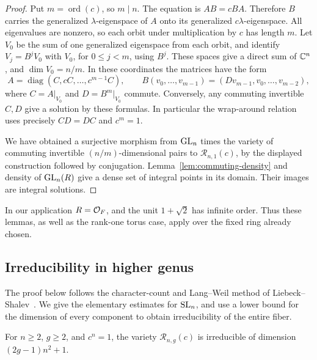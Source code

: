 \begin{proof}
Put \(m=\operatorname{ord}(c)\), so \(m\mid n\).  The equation is
\(AB=cBA\).  Therefore \(B\) carries the generalized
\(\lambda\)-eigenspace of \(A\) onto its generalized
\(c\lambda\)-eigenspace.  All eigenvalues are nonzero, so each orbit
under multiplication by \(c\) has length \(m\).
Let \(V_0\) be the sum of one generalized eigenspace from each orbit,
and identify \(V_j=B^jV_0\) with \(V_0\), for \(0\leq j<m\),
using \(B^j\).  These spaces give a direct sum of \(\mathbb C^n\), and
\(\dim V_0=n/m\).  In these coordinates the matrices have the form
\[
 A=\operatorname{diag}(C,cC,\ldots,c^{m-1}C),\qquad
 B(v_0,\ldots,v_{m-1})=(Dv_{m-1},v_0,\ldots,v_{m-2}),
\]
where \(C=A|_{V_0}\) and \(D=B^m|_{V_0}\) commute.
Conversely, any commuting invertible \(C,D\) give a solution by these
formulas.  In particular the wrap-around relation uses precisely
\(CD=DC\) and \(c^m=1\).

We have obtained a surjective morphism from
\(\operatorname{GL}_n\) times the variety of commuting invertible
\((n/m)\)-dimensional pairs to \(\mathcal R_{n,1}(c)\), by the displayed
construction followed by conjugation.  Lemma~\ref{lem:commuting-density}
and density of \(\operatorname{GL}_n(R)\) give a dense set of integral points in its
domain.  Their images are integral solutions.
\end{proof}

In our application \(R=\mathcal O_F\), and the unit \(1+\sqrt2\) has
infinite order.  Thus these lemmas, as well as the rank-one torus
case, apply over the fixed ring already chosen.

\subsection{Irreducibility in higher genus}

The proof below follows the character-count and Lang--Weil method of
Liebeck--Shalev~\cite[Section~7, Lemma~7.1 and the proof of Theorem~1.8]{LiebeckShalev2005}.
We give the elementary
estimates for \(\operatorname{SL}_n\), and use a lower bound for the dimension of
every component to obtain irreducibility of the entire fiber.

\begin{proposition}\label{prop:surface-irreducibility}
For \(n\geq2\), \(g\geq2\), and \(c^n=1\), the variety
\(\mathcal R_{n,g}(c)\) is irreducible of dimension
\((2g-1)n^2+1\).
\end{proposition}

